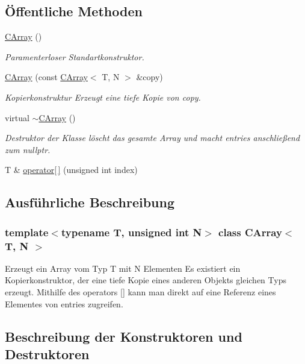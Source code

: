 \subsection*{Öffentliche Methoden}
\begin{DoxyCompactItemize}
\item 
\hyperlink{class_c_array_aa2f1336f8d60cfd1396a920a04a0e0bb}{C\+Array} ()
\begin{DoxyCompactList}\small\item\em Paramenterloser Standartkonstruktor. \end{DoxyCompactList}\item 
\hyperlink{class_c_array_add790ca71782225282e735fabaa36626}{C\+Array} (const \hyperlink{class_c_array}{C\+Array}$<$ T, N $>$ \&copy)
\begin{DoxyCompactList}\small\item\em Kopierkonstruktur Erzeugt eine tiefe Kopie von copy. \end{DoxyCompactList}\item 
virtual \hyperlink{class_c_array_a1aa64db8be620da54c5987f16544a206}{$\sim$\+C\+Array} ()
\begin{DoxyCompactList}\small\item\em Destruktor der Klasse löscht das gesamte Array und macht entries anschließend zum nullptr. \end{DoxyCompactList}\item 
T \& \hyperlink{class_c_array_a81dc8949159e2f4b213d33a5d2b5aec7}{operator\mbox{[}$\,$\mbox{]}} (unsigned int index)
\end{DoxyCompactItemize}


\subsection{Ausführliche Beschreibung}
\subsubsection*{template$<$typename T, unsigned int N$>$\newline
class C\+Array$<$ T, N $>$}

Erzeugt ein Array vom Typ T mit N Elementen Es existiert ein Kopierkonstruktor, der eine tiefe Kopie eines anderen Objekts gleichen Typs erzeugt. Mithilfe des operators \mbox{[}\mbox{]} kann man direkt auf eine Referenz eines Elementes von entries zugreifen. 

\subsection{Beschreibung der Konstruktoren und Destruktoren}
\mbox{\label{class_c_array_aa2f1336f8d60cfd1396a920a04a0e0bb}} 
